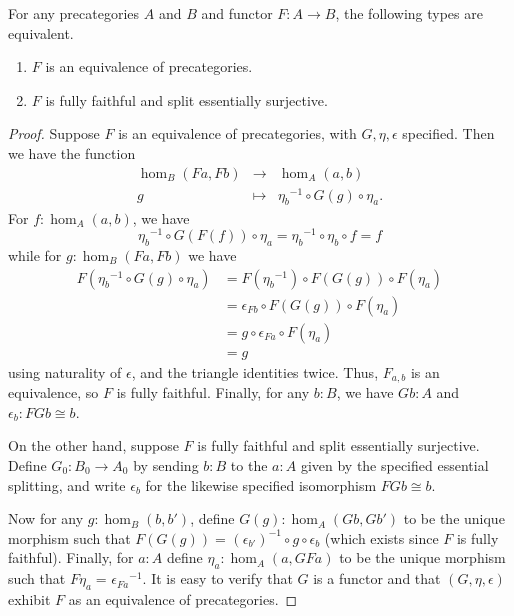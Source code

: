 \documentclass{mscs}
\newcommand{\id}[3][]{\ensuremath{#2 =_{#1} #3}\xspace}
\numberwithin{equation}{section}
\newcommand{\inv}[1]{{#1}^{-1}}
\begin{document}
\begin{lem}\label{ct:ffeso}
  For any precategories $A$ and $B$ and functor $F:A\to B$, the following types are equivalent.
  \begin{enumerate}
  \item $F$ is an equivalence of precategories.\label{item:ct:ffeso1}
  \item $F$ is fully faithful and split essentially surjective.\label{item:ct:ffeso2}
  \end{enumerate}
\end{lem}
\begin{proof}
  Suppose $F$ is an equivalence of precategories, with $G,\eta,\epsilon$ specified.
  Then we have the function
  \begin{equation*}
    \begin{array}{rcl}
      \hom_B(Fa,Fb) &\to& \hom_A(a,b)\\
      g &\mapsto& \inv{\eta_b}\circ G(g)\circ \eta_a.
    \end{array}
  \end{equation*}
  For $f:\hom_A(a,b)$, we have
  \[ \inv{\eta_{b}}\circ G(F(f))\circ \eta_{a}  =
  \inv{\eta_{b}} \circ \eta_{b} \circ f=
  f
  \]
  while for $g:\hom_B(Fa,Fb)$ we have
  \begin{align*}
    F(\inv{\eta_b} \circ G(g)\circ\eta_a)
    &= F(\inv{\eta_b})\circ F(G(g))\circ F(\eta_a)\\
    &= \epsilon_{Fb}\circ F(G(g))\circ F(\eta_a)\\
    &= g\circ\epsilon_{Fa}\circ F(\eta_a)\\
    &= g
  \end{align*}
  using naturality of $\epsilon$, and the triangle identities twice.
  Thus, $F_{a,b}$ is an equivalence, so $F$ is fully faithful.
  Finally, for any $b:B$, we have $Gb:A$ and $\epsilon_b:FGb\cong b$.

  On the other hand, suppose $F$ is fully faithful and split essentially surjective.
  Define $G_0:B_0\to A_0$ by sending $b:B$ to the $a:A$ given by the specified essential splitting, and write $\epsilon_b$ for the likewise specified isomorphism $FGb\cong b$.

  Now for any $g:\hom_B(b,b')$, define $G(g):\hom_A(Gb,Gb')$ to be the unique morphism such that $\id{F(G(g))}{\inv{(\epsilon_{b'})}\circ g \circ \epsilon_b }$ (which exists since $F$ is fully faithful).
  Finally, for $a:A$ define $\eta_a:\hom_A(a,GFa)$ to be the unique morphism such that $\id{F\eta_a}{\inv{\epsilon_{Fa}}}$.
  It is easy to verify that $G$ is a functor and that $(G,\eta,\epsilon)$ exhibit $F$ as an equivalence of precategories.


\end{proof}
\end{document}
